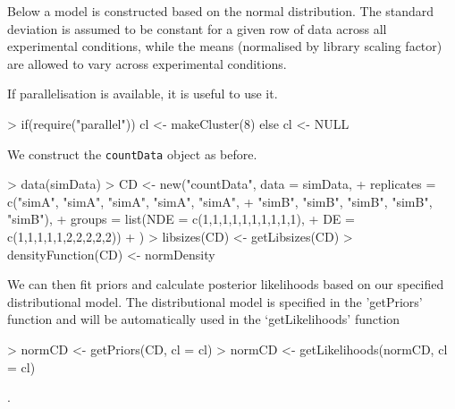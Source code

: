 \documentclass[a4paper]{article}
\begin{document}
Below a model is constructed based on the normal distribution. The standard deviation is assumed to be constant for a given row of data across all experimental conditions, while the means (normalised by library scaling factor) are allowed to vary across experimental conditions.


If parallelisation is available, it is useful to use it.

\begin{Schunk}
\begin{Sinput}
> if(require("parallel")) cl <- makeCluster(8) else cl <- NULL
\end{Sinput}
\end{Schunk}

\begin{Schunk}
\end{Schunk}

We construct the \verb'countData' object as before.

\begin{Schunk}
\begin{Sinput}
> data(simData)
> CD <- new("countData", data = simData, 
+           replicates = c("simA", "simA", "simA", "simA", "simA",
+             "simB", "simB", "simB", "simB", "simB"),
+           groups = list(NDE = c(1,1,1,1,1,1,1,1,1,1),
+                          DE = c(1,1,1,1,1,2,2,2,2,2))
+           )
> libsizes(CD) <- getLibsizes(CD)
> densityFunction(CD) <- normDensity
\end{Sinput}
\end{Schunk}

We can then fit priors and calculate posterior likelihoods based on our specified distributional model.  The distributional model is specified in the 'getPriors' function and will be automatically used in the `getLikelihoods' function

\begin{Schunk}
\begin{Sinput}
> normCD <- getPriors(CD, cl = cl)
> normCD <- getLikelihoods(normCD, cl = cl)
\end{Sinput}
\begin{Soutput}
.
\end{Soutput}
\end{Schunk}
\end{document}
